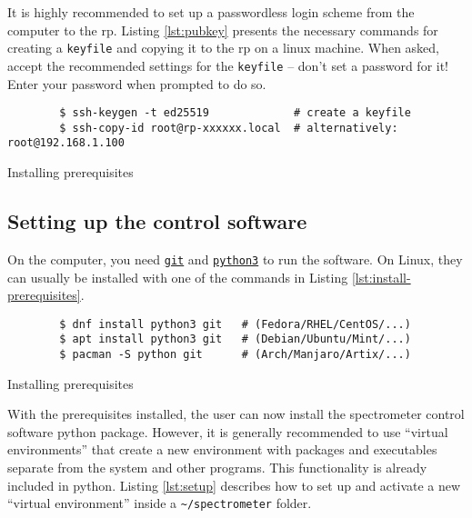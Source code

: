 It is highly recommended to set up a passwordless login scheme from the computer to the \acrshort{rp}. Listing \ref{lst:pubkey} presents the necessary commands for creating a \lstinline{keyfile} and copying it to the \acrshort{rp} on a \acrshort{linux} machine. When asked, accept the recommended settings for the \lstinline{keyfile} -- don't set a password for it! Enter your password when prompted to do so.

\begin{listing}[h!bt]
    \begin{verbatim}
        $ ssh-keygen -t ed25519             # create a keyfile
        $ ssh-copy-id root@rp-xxxxxx.local  # alternatively: root@192.168.1.100
    \end{verbatim}
    \caption{Installing prerequisites}
    \label{lst:pubkey}
\end{listing}

\subsection{Setting up the control software}
On the computer, you need \href{https://git-scm.com/}{\lstinline{git}} and \href{https://www.python.org/}{\lstinline{python3}} to run the software. On Linux, they can usually be installed with one of the commands in Listing \ref{lst:install-prerequisites}.

\begin{listing}[h!bt]
    \begin{verbatim}
        $ dnf install python3 git   # (Fedora/RHEL/CentOS/...)
        $ apt install python3 git   # (Debian/Ubuntu/Mint/...)
        $ pacman -S python git      # (Arch/Manjaro/Artix/...)
    \end{verbatim}
    \caption{Installing prerequisites}
    \label{lst:install-prerequisites}
\end{listing}

With the prerequisites installed, the user can now install the spectrometer control software \gls{python} package. However, it is generally recommended to use \enquote{virtual environments} that create a new environment with packages and executables separate from the system and other programs. This functionality is already included in \gls{python}. Listing \ref{lst:setup} describes how to set up and activate a new \enquote{virtual environment} inside a \lstinline{~/spectrometer} folder.

